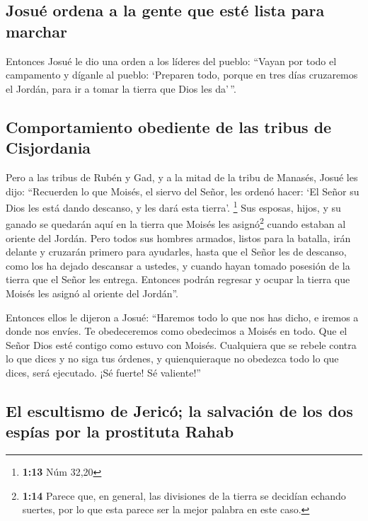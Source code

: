 \hypertarget{josuuxe9-ordena-a-la-gente-que-estuxe9-lista-para-marchar}{%
\subsection{Josué ordena a la gente que esté lista para
marchar}\label{josuuxe9-ordena-a-la-gente-que-estuxe9-lista-para-marchar}}

 Entonces Josué le dio una orden a los líderes del
pueblo:  ``Vayan por todo el campamento y díganle al
pueblo: `Preparen todo, porque en tres días cruzaremos el Jordán, para
ir a tomar la tierra que Dios les da'\,''.

\hypertarget{comportamiento-obediente-de-las-tribus-de-cisjordania}{%
\subsection{Comportamiento obediente de las tribus de
Cisjordania}\label{comportamiento-obediente-de-las-tribus-de-cisjordania}}

 Pero a las tribus de Rubén y Gad, y a la mitad de la
tribu de Manasés, Josué les dijo:  ``Recuerden lo que
Moisés, el siervo del Señor, les ordenó hacer: `El Señor su Dios les
está dando descanso, y les dará esta tierra'. \footnote{\textbf{1:13}
  Núm 32,20}  Sus esposas, hijos, y su ganado se quedarán
aquí en la tierra que Moisés les asignó\footnote{\textbf{1:14} Parece
  que, en general, las divisiones de la tierra se decidían echando
  suertes, por lo que esta parece ser la mejor palabra en este caso.}
cuando estaban al oriente del Jordán. Pero todos sus hombres armados,
listos para la batalla, irán delante y cruzarán primero para ayudarles,
 hasta que el Señor les de descanso, como los ha dejado
descansar a ustedes, y cuando hayan tomado posesión de la tierra que el
Señor les entrega. Entonces podrán regresar y ocupar la tierra que
Moisés les asignó al oriente del Jordán''.

 Entonces ellos le dijeron a Josué: ``Haremos todo lo que
nos has dicho, e iremos a donde nos envíes.  Te
obedeceremos como obedecimos a Moisés en todo. Que el Señor Dios esté
contigo como estuvo con Moisés.  Cualquiera que se rebele
contra lo que dices y no siga tus órdenes, y quienquieraque no obedezca
todo lo que dices, será ejecutado. ¡Sé fuerte! Sé valiente!''

\hypertarget{el-escultismo-de-jericuxf3-la-salvaciuxf3n-de-los-dos-espuxedas-por-la-prostituta-rahab}{%
\subsection{El escultismo de Jericó; la salvación de los dos espías por
la prostituta
Rahab}\label{el-escultismo-de-jericuxf3-la-salvaciuxf3n-de-los-dos-espuxedas-por-la-prostituta-rahab}}

